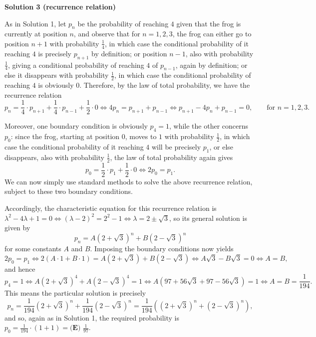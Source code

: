\begin{enumerate}
\textbf{Solution 3 (recurrence relation)}

As in Solution 1, let $p_n$ be the probability of reaching $4$ given that the frog is currently at position $n$, and observe that for $n = 1,2,3$, the frog can either go to position $n+1$ with probability $\frac{1}{4}$, in which case the conditional probability of it reaching $4$ is precisely $p_{n+1}$ by definition; or position $n-1$, also with probability $\frac{1}{4}$, giving a conditional probability of reaching $4$ of $p_{n-1}$, again by definition; or else it disappears with probability $\frac{1}{2}$, in which case the conditional probability of reaching $4$ is obviously $0$. Therefore, by the law of total probability, we have the recurrence relation 
 \[p_n = \frac{1}{4} \cdot p_{n+1} + \frac{1}{4} \cdot p_{n-1} + \frac{1}{2} \cdot 0 \iff 4p_n = p_{n+1}+p_{n-1} \iff p_{n+1}-4p_n+p_{n-1} = 0, \qquad \text{for } n = 1,2,3.\]

 Moreover, one boundary condition is obviously $p_4 = 1$, while the other concerns $p_0$: since the frog, starting at position $0$, moves to $1$ with probability $\frac{1}{2}$, in which case the conditional probability of it reaching $4$ will be precisely $p_1$, or else disappears, also with probability $\frac{1}{2}$, the law of total probability again gives 
 \[p_0 = \frac{1}{2} \cdot p_1 + \frac{1}{2} \cdot 0 \iff 2p_0 = p_1.\] We can now simply use standard methods to solve the above recurrence relation, subject to these two boundary conditions.

 
Accordingly, the characteristic equation for this recurrence relation is $\lambda^2 - 4\lambda + 1 = 0 \iff (\lambda-2)^2 = 2^2-1 \iff \lambda = 2 \pm \sqrt{3}$, so its general solution is given by 
 \[p_n = A\left(2+\sqrt{3}\right)^n + B\left(2-\sqrt{3}\right)^n\] for some constants $A$ and $B$. Imposing the boundary conditions now yields 
 \[2p_0 = p_1 \iff 2(A \cdot 1 + B \cdot 1) = A\left(2+\sqrt{3}\right) + B\left(2-\sqrt{3}\right) \iff A\sqrt{3}-B\sqrt{3} = 0 \iff A = B,\] and hence 
 \[p_4 = 1 \iff A\left(2+\sqrt{3}\right)^4+A\left(2-\sqrt{3}\right)^4 = 1 \iff A\left(97+56\sqrt{3}+97-56\sqrt{3}\right) = 1 \iff A = B = \frac{1}{194}.\]This means the particular solution is precisely 
 \[p_n = \frac{1}{194}\left(2+\sqrt{3}\right)^n + \frac{1}{194}\left(2-\sqrt{3}\right)^n = \frac{1}{194}\left(\left(2+\sqrt{3}\right)^n+\left(2-\sqrt{3}\right)^n\right),\]and so, again as in Solution 1, the required probability is $p_0 = \frac{1}{194}\cdot\left(1+1\right) = \boxed{ \textbf{(E) } \frac{1}{97}}.$




\end{enumerate}
